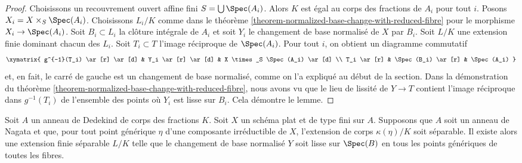 \begin{proof}
Choisissons un recouvrement ouvert affine fini $S = \bigcup \Spec(A_i)$.
Alors $K$ est égal au corps des fractions de $A_i$ pour tout $i$.
Posons $X_i = X \times_S \Spec(A_i)$.
Choisissons $L_i/K$ comme dans le
théorème \ref{theorem-normalized-base-change-with-reduced-fibre}
pour le morphisme $X_i \to \Spec(A_i)$.
Soit $B_i \subset L_i$ la clôture intégrale de $A_i$ et
soit $Y_i$ le changement de base normalisé de $X$ par $B_i$.
Soit $L/K$ une extension finie dominant chacun des $L_i$.
Soit $T_i \subset T$ l'image réciproque de $\Spec(A_i)$.
Pour tout $i$, on obtient un diagramme commutatif
$$
\xymatrix{
g^{-1}(T_i) \ar[r] \ar[d] & Y_i \ar[r] \ar[d] & X \times_S \Spec(A_i) \ar[d] \\
T_i \ar[r] & \Spec(B_i) \ar[r] & \Spec(A_i)
}
$$
et, en fait, le carré de gauche est un changement de base normalisé,
comme on l'a expliqué au début de la section. Dans la démonstration
du théorème \ref{theorem-normalized-base-change-with-reduced-fibre},
nous avons vu que le lieu de lissité de $Y \to T$ contient
l'image réciproque dans $g^{-1}(T_i)$ de l'ensemble des points
où $Y_i$ est lisse sur $B_i$. Cela démontre le lemme.
\end{proof}

\begin{lemma}
\label{lemma-normalized-base-change-with-reduced-fibre-separable}
Soit $A$ un anneau de Dedekind de corps des fractions $K$.
Soit $X$ un schéma plat et de type fini sur $A$.
Supposons que $A$ soit un anneau de Nagata et que, pour tout point générique
$\eta$ d'une composante irréductible de $X$, l'extension de corps
$\kappa(\eta)/K$ soit séparable.
Il existe alors une extension finie séparable $L/K$ telle que
le changement de base normalisé $Y$ soit lisse sur $\Spec(B)$
en tous les points génériques de toutes les fibres.
\end{lemma}


